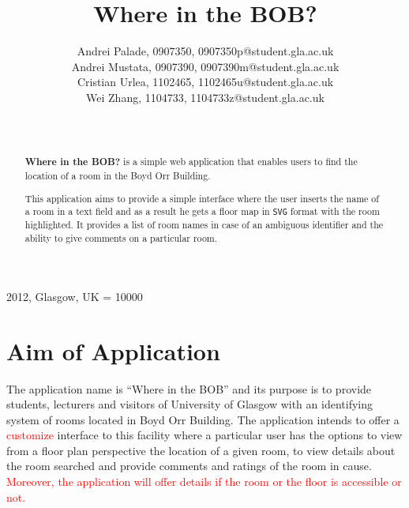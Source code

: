 \documentclass{sig-alt-release2}
\begin{document}
\newcommand{\todo}[1]{\textcolor{red}{#1}}
\def\newblock{\hskip .11em plus .33em minus .07em}

 {2012, Glasgow, UK} 
\widowpenalty = 10000

\title{{Where in the BOB?}}

\author{
Andrei Palade, 0907350, 0907350p@student.gla.ac.uk\\
Andrei Mustata, 0907390, 0907390m@student.gla.ac.uk\\
Cristian Urlea, 1102465, 1102465u@student.gla.ac.uk \\
Wei Zhang, 1104733, 1104733z@student.gla.ac.uk\\
\\
          \\
}

\maketitle

\begin{abstract}

\textbf{Where in the BOB?} is a simple web application that enables users to
find the location of a room in the Boyd Orr Building. 
   
This application aims to provide a simple interface where the user inserts the
name of a room in a text field and as a result he gets a floor map in \texttt{SVG}
format with the room highlighted. It provides a list of room names in case of
an ambiguous identifier and the ability to give comments on a particular room. 

\end{abstract}

\section{Aim of Application}

The application name is ``Where in the BOB'' and its purpose is to provide
students, lecturers and visitors of University of Glasgow with an identifying
system of rooms located in Boyd Orr Building. The application intends to
offer a \todo{customize} interface to this facility where a particular user has the
options to view from a floor plan perspective the location of a given room,
to view details about the room searched and provide comments and ratings of
the room in cause. \todo{Moreover, the application will offer details if the room
or the floor is accessible or not.}
\end{document}
